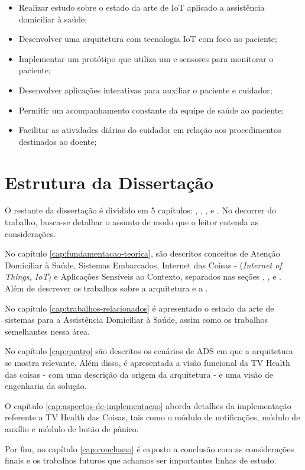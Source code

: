 \begin{itemize}
  \item Realizar estudo sobre o estado da arte de IoT aplicado a assistência domiciliar à saúde;
  \item Desenvolver uma arquitetura com tecnologia IoT com foco no paciente;
  \item Implementar um protótipo que utiliza um \stb[] e sensores para monitorar o paciente;
  \item Desenvolver aplicações interativas para auxiliar o paciente e cuidador;
  \item Permitir um acompanhamento constante da equipe de saúde ao paciente;
  \item Facilitar as atividades diárias do cuidador em relação aos procedimentos
  destinados ao doente;
\end{itemize}

\section{Estrutura da Dissertação}\label{sec:estrutura}

O restante da dissertação é dividido em 5 capítulos: ,
, , 
e . No decorrer do trabalho, busca-se detalhar o assunto de modo que o
leitor entenda as considerações. 

No capítulo \ref{cap:fundamentacao-teorica}, são descritos conceitos de Atenção
Domiciliar à Saúde, Sistemas Embarcados, Internet das Coisas -
(\textit{Internet of Things, IoT}) e Aplicações Sensíveis ao Contexto,
separados nas seções , ,
 e . Além de descrever os trabalhos sobre
a arquitetura  e a .

No capítulo \ref{cap:trabalhos-relacionados} é apresentado o estado da arte de
sistemas para a Assistência Domiciliar à Saúde, assim como os trabalhos semelhantes
nessa área.

No capítulo \ref{cap:quatro} são descritos os cenários de ADS em que a arquitetura
se mostra relevante. Além disso, é apresentada a visão funcional da TV Health das
coisas - com uma descrição da origem da arquitetura - e uma visão de engenharia da solução.

O capítulo \ref{cap:aspectos-de-implementacao} aborda detalhes da implementação
referente a TV Health das Coisas, tais como o módulo de notificações, módulo de 
auxílio e módulo de botão de pânico.

Por fim, no capítulo \ref{cap:conclusao} é exposto a conclusão com as 
considerações finais e os trabalhos futuros que achamos ser importantes linhas
de estudo.
